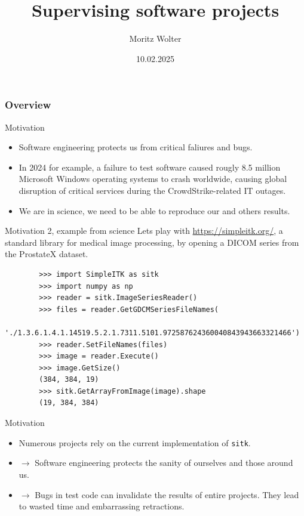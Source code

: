 \documentclass{beamer}
\title{Supervising software projects}
\date{10.02.2025}
\institute{HPCA-Lab, Universität Bonn}
\author{Moritz Wolter}
\begin{document}
    \maketitle

    \begin{frame}
    \frametitle{Overview} 
    \tableofcontents
    \end{frame}
    

    \begin{frame}{Motivation}
      \begin{itemize}
        \item Software engineering protects us from critical faliures and bugs.
        \item In 2024 for example, a failure to test software caused rougly 8.5 million Microsoft Windows operating systems to crash worldwide, causing global disruption of critical services
        during the CrowdStrike-related IT outages.
        \item We are in science, we need to be able to reproduce our and others results.
      \end{itemize}
    \end{frame}

    \begin{frame}[fragile]{Motivation 2, example from science}
      Lets play with \url{https://simpleitk.org/}, a standard library for medical image processing,
      by opening a DICOM series from the ProstateX dataset.
      \begin{verbatim}
        >>> import SimpleITK as sitk
        >>> import numpy as np
        >>> reader = sitk.ImageSeriesReader()
        >>> files = reader.GetGDCMSeriesFileNames(
          './1.3.6.1.4.1.14519.5.2.1.7311.5101.972587624360040843943663321466')
        >>> reader.SetFileNames(files)
        >>> image = reader.Execute()
        >>> image.GetSize()
        (384, 384, 19)
        >>> sitk.GetArrayFromImage(image).shape
        (19, 384, 384)
      \end{verbatim}
    \end{frame}

    \begin{frame}{Motivation}
      \begin{itemize}
        \item Numerous projects rely on the current implementation of \texttt{sitk}.
        \item $\rightarrow$ Software engineering protects the sanity of ourselves and those around us.
        \item $\rightarrow$ Bugs in test code can invalidate the results of entire projects. They lead to wasted time and embarrassing retractions.
      \end{itemize}
    \end{frame}
\end{document}
